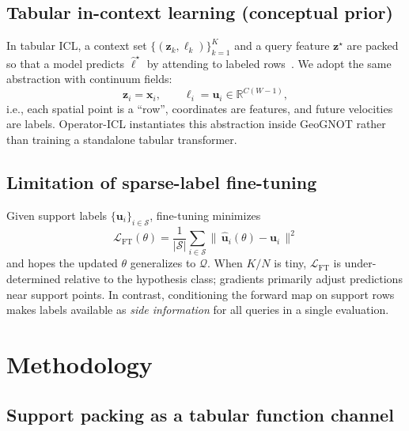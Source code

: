 \documentclass[11pt,a4paper]{article}
\begin{document}
\subsection{Tabular in-context learning (conceptual prior)}
\label{sec:tabicl}

In tabular ICL, a context set $\{( \mathbf{z}_k, \ell_k)\}_{k=1}^{K}$ and a query feature $\mathbf{z}^{\star}$ are packed so that a model predicts $\hat{\ell}^{\star}$ by attending to labeled rows~\cite{hollmann2025tabicl}.
We adopt the same abstraction with continuum fields:
\begin{equation}
\mathbf{z}_i=\mathbf{x}_i,\qquad \ell_i=\mathbf{u}_i\in\mathbb{R}^{C(W-1)},
\end{equation}
i.e., each spatial point is a ``row'', coordinates are features, and future velocities are labels.
Operator-ICL instantiates this abstraction inside GeoGNOT rather than training a standalone tabular transformer.

\subsection{Limitation of sparse-label fine-tuning}
\label{sec:limit_ft}

Given support labels $\{\mathbf{u}_i\}_{i\in\mathcal{S}}$, fine-tuning minimizes
\begin{equation}
\mathcal{L}_{\mathrm{FT}}(\theta)=\frac{1}{|\mathcal{S}|}\sum_{i\in\mathcal{S}}
\bigl\|\,\hat{\mathbf{u}}_i(\theta)-\mathbf{u}_i\,\bigr\|^2
\end{equation}
and hopes the updated $\theta$ generalizes to $\mathcal{Q}$.
When $K/N$ is tiny, $\mathcal{L}_{\mathrm{FT}}$ is under-determined relative to the hypothesis class; gradients primarily adjust predictions near support points.
In contrast, conditioning the forward map on support rows makes labels available as \emph{side information} for all queries in a single evaluation.

\section{Methodology}
\label{sec:method}

\subsection{Support packing as a tabular function channel}
\label{sec:support}
\end{document}
